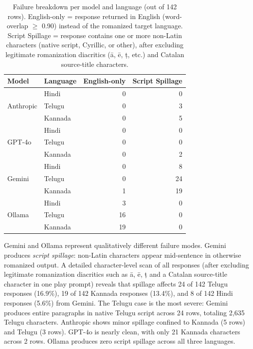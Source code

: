 \begin{table}[t]
\centering
\small
\begin{tabular}{llrr}
\toprule
Model & Language & English-only & Script Spillage \\
\midrule
\multirow{3}{*}{Anthropic} & Hindi   & 0  & 0  \\
                            & Telugu  & 0  & 3  \\
                            & Kannada & 0  & 5  \\
\midrule
\multirow{3}{*}{GPT-4o}    & Hindi   & 0  & 0  \\
                            & Telugu  & 0  & 0  \\
                            & Kannada & 0  & 2  \\
\midrule
\multirow{3}{*}{Gemini}    & Hindi   & 0  & 8  \\
                            & Telugu  & 0  & 24 \\
                            & Kannada & 1  & 19 \\
\midrule
\multirow{3}{*}{Ollama}    & Hindi   & 3  & 0  \\
                            & Telugu  & 16 & 0  \\
                            & Kannada & 19 & 0  \\
\bottomrule
\end{tabular}
\caption{Failure breakdown per model and language (out of 142 rows). English-only
= response returned in English (word-overlap $\geq$ 0.90) instead of the
romanized target language. Script Spillage = response contains one or more
non-Latin characters (native script, Cyrillic, or other), after excluding
legitimate romanization diacritics (ā, ē, ṭ, etc.) and Catalan source-title
characters.}
\label{tab:failures}
\end{table}

Gemini and Ollama represent qualitatively different failure modes. Gemini
produces \emph{script spillage}: non-Latin characters appear mid-sentence in
otherwise romanized output. A detailed character-level scan of all responses
(after excluding legitimate romanization diacritics such as \={a}, \={e},
\d{t} and a Catalan source-title character in one play prompt) reveals that
spillage affects 24 of 142 Telugu responses (16.9\%), 19 of 142 Kannada
responses (13.4\%), and 8 of 142 Hindi responses (5.6\%) from Gemini. The
Telugu case is the most severe: Gemini produces entire paragraphs in native
Telugu script across 24 rows, totaling 2,635 Telugu characters. Anthropic
shows minor spillage confined to Kannada (5 rows) and Telugu (3 rows).
GPT-4o is nearly clean, with only 21 Kannada characters across 2 rows.
Ollama produces zero script spillage across all three languages.

